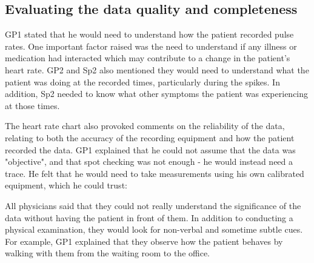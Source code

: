 \documentclass{sigchi}
\begin{document}

\subsection{Evaluating the data quality and completeness}

GP1 stated that he would need to understand how the patient recorded pulse rates. One important factor raised was the need to understand if any illness or medication had interacted which may contribute to a change in the patient's heart rate. GP2 and Sp2 also mentioned they would need to understand what the patient was doing at the recorded times, particularly during the spikes. In addition, Sp2 needed to know what other symptoms the patient was experiencing at those times. 

The heart rate chart also provoked comments on the reliability of the data, relating to both the accuracy of the recording equipment and how the patient recorded the data. GP1 explained that he could not assume that the data was "objective", and that spot checking was not enough - he would instead need a trace. He felt that he would need to take measurements using his own calibrated equipment, which he could trust:


All physicians said that they could not really understand the significance of the data without having the patient in front of them.  In addition to conducting a physical examination, they would look for non-verbal and sometime subtle cues.  For example, GP1 explained that they observe how the patient behaves by walking with them from the waiting room to the office. 

\end{document}
